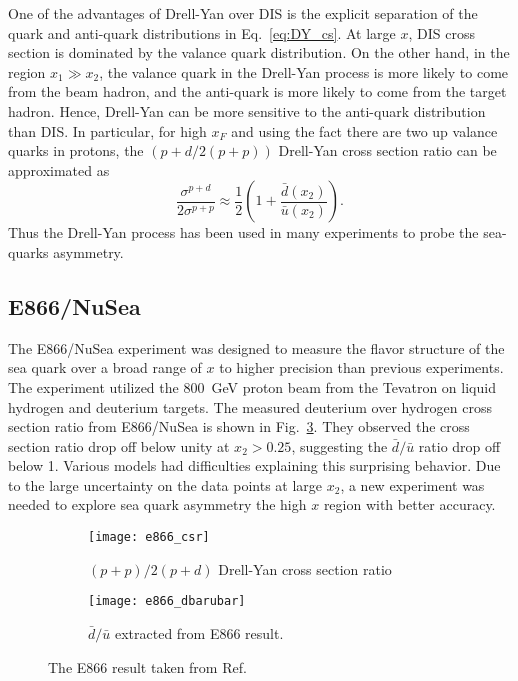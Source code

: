 \documentclass[../main.tex]{subfiles}
\begin{document}
One of the advantages of Drell-Yan over DIS is the explicit separation of the quark
and anti-quark distributions in Eq.\ \ref{eq:DY_cs}. At large $x$, DIS cross section 
is dominated by the valance quark distribution. On the other hand, in the region $x_1 \gg x_2$,
the valance quark in the Drell-Yan process is more likely to come from the beam 
hadron, and the anti-quark is more likely to come from the target hadron. Hence,
Drell-Yan can be more sensitive to the anti-quark distribution than DIS. In 
particular, for high $x_F$ and using the fact there are two up valance quarks in 
protons, the $(p+d/2(p+p))$ Drell-Yan cross section ratio can be approximated as 
\begin{equation}
	\frac{\sigma^{p+d}}{2\sigma^{p+p}} \approx \frac{1}{2} \left( 1+ \frac{\bar{d}\left(x_2\right)}{\bar{u}\left(x_2\right)} \right).
\end{equation}
Thus the Drell-Yan process has been used in many experiments to probe the sea-quarks 
asymmetry.


\subsection{E866/NuSea}
\label{sec:E866}
The E866/NuSea experiment was designed to measure the flavor structure of the sea 
quark over a broad range of $x$ to higher precision than previous experiments. The 
experiment utilized the \SI{800}{\GeV} proton beam from the Tevatron on liquid 
hydrogen and deuterium targets. The measured deuterium over hydrogen cross section 
ratio from E866/NuSea is shown in Fig.\ \ref{fig:e866_result}. They observed the
cross section ratio drop off below unity at $x_2>0.25$, suggesting the $\bar{d}/\bar{u}$ 
ratio drop off below 1. Various models had difficulties explaining this surprising 
behavior. Due to the large uncertainty on the data points at large $x_2$, a new 
experiment was needed to explore sea quark asymmetry the high $x$ region with better 
accuracy.
\begin{figure}[htbp!]
	\centering
	\begin{subfigure}{0.45\linewidth}
		\texttt{[image: e866\_csr]}
		\caption{$(p+p)/2(p+d)$ Drell-Yan cross section ratio}
		\label{subfig:e866_csr}
	\end{subfigure}
	\begin{subfigure}{0.45\linewidth}
		\texttt{[image: e866\_dbarubar]}
		\caption{$\bar{d}/\bar{u}$ extracted from E866 result.}
		\label{subfig:e866_dbarubar}
	\end{subfigure}
	\caption{The E866 result taken from Ref.\ \cite{towell2001}}
	\label{fig:e866_result}
\end{figure}
\end{document}
